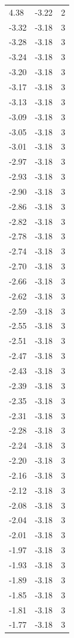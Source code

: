\begin{longtable}{lrr}
  4.38 & -3.22 & 2 \\
  -3.32 & -3.18 & 3 \\
  -3.28 & -3.18 & 3 \\
  -3.24 & -3.18 & 3 \\
  -3.20 & -3.18 & 3 \\
  -3.17 & -3.18 & 3 \\
  -3.13 & -3.18 & 3 \\
  -3.09 & -3.18 & 3 \\
  -3.05 & -3.18 & 3 \\
  -3.01 & -3.18 & 3 \\
  -2.97 & -3.18 & 3 \\
  -2.93 & -3.18 & 3 \\
  -2.90 & -3.18 & 3 \\
  -2.86 & -3.18 & 3 \\
  -2.82 & -3.18 & 3 \\
  -2.78 & -3.18 & 3 \\
  -2.74 & -3.18 & 3 \\
  -2.70 & -3.18 & 3 \\
  -2.66 & -3.18 & 3 \\
  -2.62 & -3.18 & 3 \\
  -2.59 & -3.18 & 3 \\
  -2.55 & -3.18 & 3 \\
  -2.51 & -3.18 & 3 \\
  -2.47 & -3.18 & 3 \\
  -2.43 & -3.18 & 3 \\
  -2.39 & -3.18 & 3 \\
  -2.35 & -3.18 & 3 \\
  -2.31 & -3.18 & 3 \\
  -2.28 & -3.18 & 3 \\
  -2.24 & -3.18 & 3 \\
  -2.20 & -3.18 & 3 \\
  -2.16 & -3.18 & 3 \\
  -2.12 & -3.18 & 3 \\
  -2.08 & -3.18 & 3 \\
  -2.04 & -3.18 & 3 \\
  -2.01 & -3.18 & 3 \\
  -1.97 & -3.18 & 3 \\
  -1.93 & -3.18 & 3 \\
  -1.89 & -3.18 & 3 \\
  -1.85 & -3.18 & 3 \\
  -1.81 & -3.18 & 3 \\
  -1.77 & -3.18 & 3 \\

\end{longtable}
